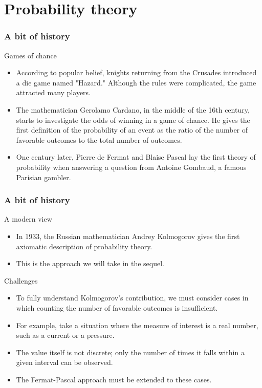 \section{Probability theory}

\begin{frame}
    \frametitle{A bit of history}
\begin{block}{Games of chance}
    \begin{itemize}
        \item<+-> According to popular belief, knights returning from the Crusades introduced a die game named "Hazard."
         Although the rules were complicated, the game attracted many players.
        \item<+-> The mathematician Gerolamo Cardano, in the middle of the 16th century, starts to investigate the odds of winning
        in a game of chance. He gives the first definition of the probability of an event as the ratio of
        the number of favorable outcomes to the total number of outcomes.
        \item<+-> One century later, Pierre de Fermat and Blaise Pascal lay the first theory of probability when
        answering a question from Antoine Gombaud, a famous Parisian gambler.
    \end{itemize}
\end{block}
\end{frame}
\begin{frame}
    \frametitle{A bit of history}
\begin{block}{A modern view}
    \begin{itemize}
        \item<+-> In 1933, the Russian mathematician Andrey Kolmogorov gives the first axiomatic description of probability theory.
        \item<+-> This is the approach we will take in the sequel.
    \end{itemize}
\end{block}    
\begin{block}{Challenges}
    \begin{itemize}
       \item<+-> To fully understand Kolmogorov's contribution, we must consider cases in which counting the number of favorable outcomes is insufficient.
       \item<+-> For example, take a situation where the measure of interest is a real number, such as a current or a pressure.
       \item<+-> The value itself is not discrete; only the number of times it falls within a given interval can be observed.
       \item<+-> The Fermat-Pascal approach must be extended to these cases.
    \end{itemize}
\end{block}    
\end{frame}
